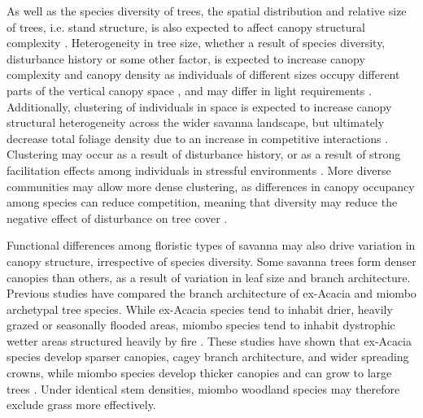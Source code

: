 \documentclass[11pt,a4paper]{article}
\begin{document}
As well as the species diversity of trees, the spatial distribution and relative size of trees, i.e. stand structure, is also expected to affect canopy structural complexity \citep{Stark2015}. Heterogeneity in tree size, whether a result of species diversity, disturbance history or some other factor, is expected to increase canopy complexity and canopy density as individuals of different sizes occupy different parts of the vertical canopy space \citep{Panzou2020}, and may differ in light requirements \citep{CharlesDominique2018}. Additionally, clustering of individuals in space is expected to increase canopy structural heterogeneity across the wider savanna landscape, but ultimately decrease total foliage density due to an increase in competitive interactions \citep{Dohn2017}. Clustering may occur as a result of disturbance history, or as a result of strong facilitation effects among individuals in stressful environments \citep{Ratcliffe2017}. More diverse communities may allow more dense clustering, as differences in canopy occupancy among species can reduce competition, meaning that diversity may reduce the negative effect of disturbance on tree cover \citep{}.

Functional differences among floristic types of savanna may also drive variation in canopy structure, irrespective of species diversity. Some savanna trees form denser canopies than others, as a result of variation in leaf size and branch architecture. Previous studies have compared the branch architecture of ex-Acacia and miombo archetypal tree species. While ex-Acacia species tend to inhabit drier, heavily grazed or seasonally flooded areas, miombo species tend to inhabit dystrophic wetter areas structured heavily by fire  \citep{Ribeiro2020}. These studies have shown that ex-Acacia species develop sparser canopies, cagey branch architecture, and wider spreading crowns, while miombo species develop thicker canopies and can grow to large trees \citep{Mugasha2013, Archibald2003, Privette2004}. Under identical stem densities, miombo woodland species may therefore exclude grass more effectively. 
\end{document}
